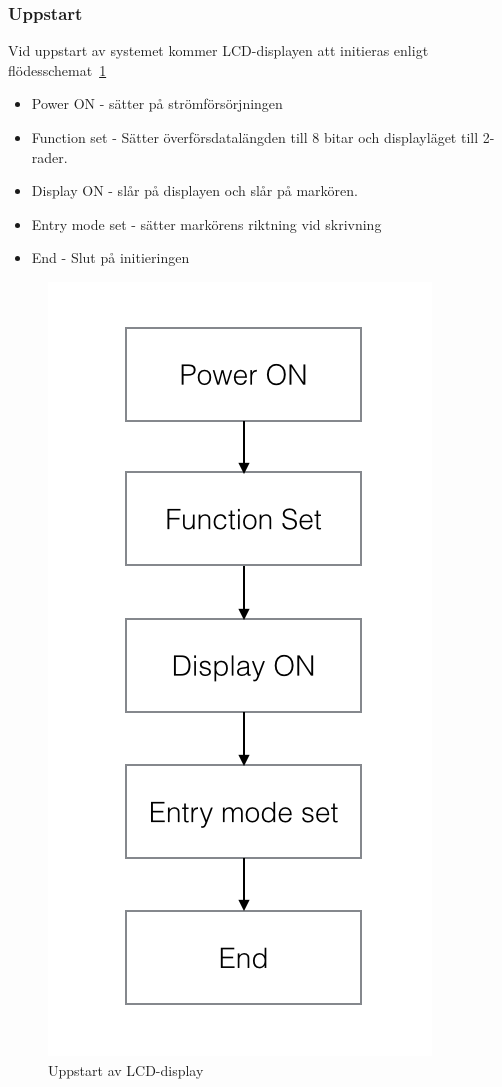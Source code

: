 \documentclass[a4paper,12pt,fleqn]{article}
\begin{document}
\subsubsection{Uppstart}
	
Vid uppstart av systemet kommer LCD-displayen att initieras enligt flödes\-schemat~\ref{fig:flowlcdstart}

\begin{itemize}
  \item Power ON - sätter på strömförsörjningen
  \item Function set - Sätter överförsdatalängden till 8 bitar och displayläget till 2-rader.
  \item Display ON - slår på displayen och slår på markören. 
  \item Entry mode set - sätter markörens riktning vid skrivning
  \item End - Slut på initieringen
\end{itemize}

\begin{figure}[htp]
	  \begin{center}
	  \includegraphics[keepaspectratio=true,scale=0.4]{bilder/startup}  %
	  \end{center}
	  \caption{Uppstart av LCD-display} %
	  \label{fig:flowlcdstart}
	\end{figure}
\end{document}
